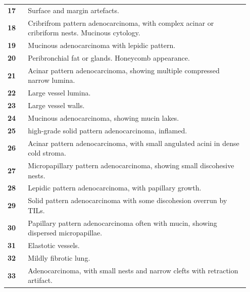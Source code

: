 \documentclass{l4proj}
\begin{document}
\begin{appendices}
\begin{longtable}{p{0.08\linewidth} p{0.87\linewidth}}
\textbf{17} & Surface and margin artefacts.                                                                        \\
\textbf{18} & Cribrifrom pattern adenocarcinoma, with complex acinar or cribriform nests. Mucinous cytology.       \\
\textbf{19} & Mucinous adenocarcinoma with lepidic pattern.                                                        \\
\textbf{20} & Peribronchial fat or glands. Honeycomb appearance.                                                   \\
\textbf{21} & Acinar pattern adenocarcinoma, showing multiple compressed narrow lumina.                            \\
\textbf{22} & Large vessel lumina.                                                                                 \\
\textbf{23} & Large vessel walls.                                                                                  \\
\textbf{24} & Mucinous adenocarcinoma, showing mucin lakes.                                                        \\
\textbf{25} & high-grade solid pattern adenocarcinoma, inflamed.                                                   \\
\textbf{26} & Acinar pattern adenocarcinoma, with small angulated acini in dense cold stroma.                      \\
\textbf{27} & Micropapillary pattern adenocarcinoma, showing small discohesive nests.                              \\
\textbf{28} & Lepidic pattern adenocarcinoma, with papillary growth.                                               \\
\textbf{29} & Solid pattern adenocarcinoma with some discohesion overrun by TILs.                                  \\
\textbf{30} & Papillary pattern adenocarcinoma often with mucin, showing dispersed micropapillae.                  \\
\textbf{31} & Elastotic vessels.                                                                                   \\
\textbf{32} & Mildly fibrotic lung.                                                                                \\
\textbf{33} & Adenocarcinoma, with small nests and narrow clefts with retraction artifact.                         \\

\end{longtable}
\end{appendices}
\end{document}
